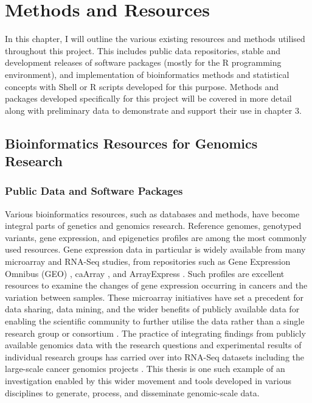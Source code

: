 \chapter{Methods and Resources}
\label{chap:methods}

In this chapter, I will outline the various existing resources and methods utilised throughout this project. This includes public data repositories, stable and development releases of software packages (mostly for the R programming environment), and implementation of bioinformatics methods and statistical concepts with Shell or R scripts developed for this purpose. Methods and packages developed specifically for this project will be covered in more detail along with preliminary data to demonstrate and support their use in chapter 3. 

\section{Bioinformatics Resources for Genomics Research}
\subsection{Public Data and Software Packages}
Various bioinformatics resources, such as databases and methods, have become integral parts of genetics and genomics research. Reference genomes, genotyped variants, gene expression, and epigenetics profiles are among the most commonly used resources. Gene expression data in particular is widely available from many microarray and RNA-Seq studies, from repositories such as Gene Expression Omnibus (GEO) \citep{GEO2016}, caArray \citep{caArray2014}, and ArrayExpress \citep{ArrayExpress2013}. Such profiles are excellent resources to examine the changes of gene expression occurring in cancers and the variation between samples. These microarray initiatives have set a precedent for data sharing, data mining, and the wider benefits of publicly available data for enabling the scientific community to further utilise the data rather than a single research group or consortium \citep{Rung2013}. The practice of integrating findings from publicly available genomics data with the research questions and experimental results of individual research groups has carried over into RNA-Seq datasets including the large-scale cancer genomics projects \citep{ICGC2011}. This thesis is one such example of an investigation enabled by this wider movement and tools developed in various disciplines to generate, process, and disseminate genomic-scale data.
 
